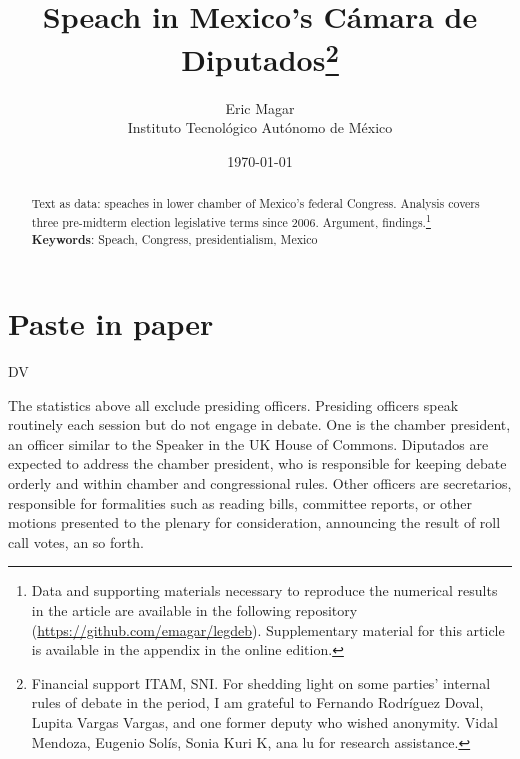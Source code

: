 \documentclass[letter,12pt]{article}
\begin{document}
\title{Speach in Mexico's Cámara de Diputados\thanks{Financial support ITAM, SNI. For shedding light on some parties' internal rules of debate in the period, I am grateful to Fernando Rodríguez Doval, Lupita Vargas Vargas, and one former deputy who wished anonymity. Vidal Mendoza, Eugenio Solís, Sonia Kuri K, ana lu for research assistance.}}
\author{Eric Magar \\ Instituto Tecnológico Autónomo de México}
\date{\today}
\maketitle

\newpage

\begin{abstract}
\noindent Text as data: speaches in lower chamber of Mexico's federal Congress. Analysis covers three pre-midterm election legislative terms since 2006. Argument, findings.\footnote{{Data and supporting materials necessary to reproduce the numerical results in the article are available in the following repository (\url{https://github.com/emagar/legdeb}). Supplementary material for this article is available in the appendix in the online edition.}}
\newline
\newline
\textbf{Keywords}: Speach, Congress, presidentialism, Mexico 
\end{abstract}

\newpage

\doublespacing

\section{Paste in paper}



DV

The statistics above all exclude presiding officers. Presiding officers speak routinely each session but do not engage in debate. One is the chamber president, an officer similar to the Speaker in the UK House of Commons. Diputados are expected to address the chamber president, who is responsible for keeping debate orderly and within chamber and congressional rules. Other officers are secretarios, responsible for formalities such as reading bills, committee reports, or other motions presented to the plenary for consideration, announcing the result of roll call votes, an so forth.  
\end{document}
